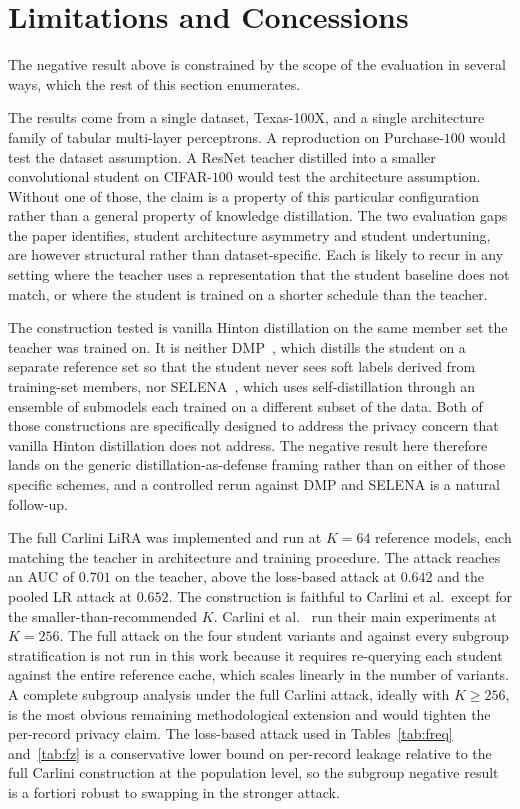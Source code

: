 \documentclass[conference]{IEEEtran}
\begin{document}
\section*{Limitations and Concessions}

The negative result above is constrained by the scope of the evaluation in several ways, which the rest of this section enumerates.

The results come from a single dataset, Texas-100X, and a single architecture family of tabular multi-layer perceptrons. A reproduction on Purchase-$100$ would test the dataset assumption. A ResNet teacher distilled into a smaller convolutional student on CIFAR-$100$ would test the architecture assumption. Without one of those, the claim is a property of this particular configuration rather than a general property of knowledge distillation. The two evaluation gaps the paper identifies, student architecture asymmetry and student undertuning, are however structural rather than dataset-specific. Each is likely to recur in any setting where the teacher uses a representation that the student baseline does not match, or where the student is trained on a shorter schedule than the teacher.

The construction tested is vanilla Hinton distillation on the same member set the teacher was trained on. It is neither DMP~\cite{shejwalkar2021}, which distills the student on a separate reference set so that the student never sees soft labels derived from training-set members, nor SELENA~\cite{tang2022}, which uses self-distillation through an ensemble of submodels each trained on a different subset of the data. Both of those constructions are specifically designed to address the privacy concern that vanilla Hinton distillation does not address. The negative result here therefore lands on the generic distillation-as-defense framing rather than on either of those specific schemes, and a controlled rerun against DMP and SELENA is a natural follow-up.

The full Carlini LiRA was implemented and run at $K = 64$ reference models, each matching the teacher in architecture and training procedure. The attack reaches an AUC of $0.701$ on the teacher, above the loss-based attack at $0.642$ and the pooled LR attack at $0.652$. The construction is faithful to Carlini et al.\ except for the smaller-than-recommended $K$. Carlini et al.~\cite{carlini2022} run their main experiments at $K = 256$. The full attack on the four student variants and against every subgroup stratification is not run in this work because it requires re-querying each student against the entire reference cache, which scales linearly in the number of variants. A complete subgroup analysis under the full Carlini attack, ideally with $K \geq 256$, is the most obvious remaining methodological extension and would tighten the per-record privacy claim. The loss-based attack used in Tables~\ref{tab:freq} and~\ref{tab:fz} is a conservative lower bound on per-record leakage relative to the full Carlini construction at the population level, so the subgroup negative result is a fortiori robust to swapping in the stronger attack.
\end{document}
